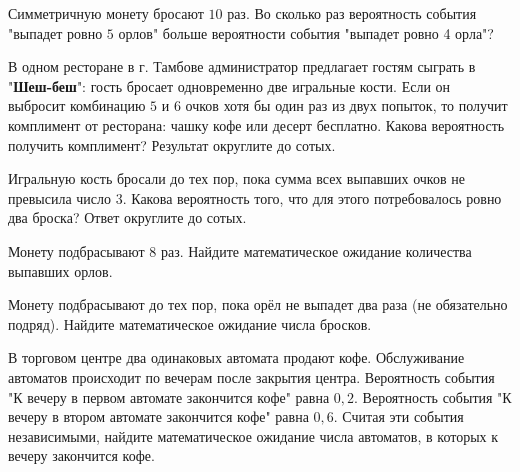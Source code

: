 \begin{consultation}
\begin{listofex}
		\item Симметричную монету бросают \(10\) раз. Во сколько раз вероятность события "выпадет ровно \(5\) орлов" больше вероятности события "выпадет ровно 4 орла"?
		\item В одном ресторане в г. Тамбове администратор предлагает гостям сыграть в "\textbf{Шеш-беш}": гость бросает одновременно две игральные кости. Если он выбросит комбинацию \(5\) и \(6\) очков хотя бы один раз из двух попыток, то получит комплимент от ресторана: чашку кофе или десерт бесплатно. Какова вероятность получить комплимент? Результат округлите до сотых.
		\item Игральную кость бросали до тех пор, пока сумма всех выпавших очков не превысила число \(3\). Какова вероятность того, что для этого потребовалось ровно два броска? Ответ округлите до сотых.
		\item Монету подбрасывают \(8\) раз. Найдите математическое ожидание количества выпавших орлов.
		\item Монету подбрасывают до тех пор, пока орёл не выпадет два раза (не обязательно подряд). Найдите математическое ожидание числа бросков.
		\item В торговом центре два одинаковых автомата продают кофе. Обслуживание автоматов происходит по вечерам после закрытия центра. Вероятность события "К вечеру в первом автомате закончится кофе" равна \(0,2\). Вероятность события "К вечеру в втором автомате закончится кофе" равна \(0,6\). Считая эти события независимыми, найдите математическое ожидание числа автоматов, в которых к вечеру закончится кофе.
		
	\end{listofex}
\end{consultation}

